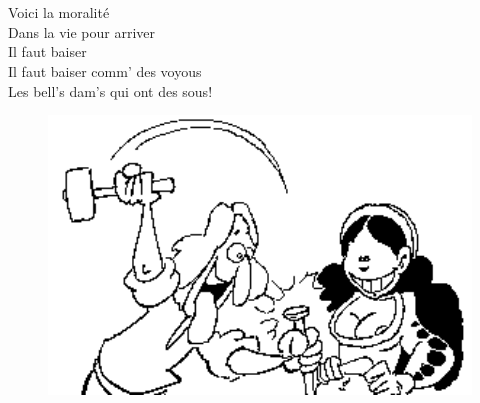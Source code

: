 \\\\Voici la moralité \bissimple
\\Dans la vie pour arriver \bissimple
\\Il faut baiser \bissimple
\\Il faut baiser comm' des voyous  
\\Les bell's dam's qui ont des sous! \bissimple
\\
\bigskip
\begin{figure}[h!]
\centering
   \includegraphics[width=1\textwidth]{images/cantonnier.png}
 \end{figure}
\breakpage